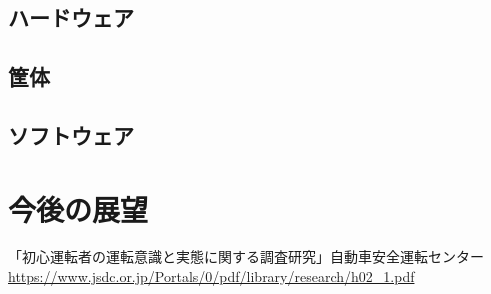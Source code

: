 \documentclass[titlepage,a4paper]{jsarticle}
\begin{document}
\subsection{ハードウェア}
\subsection{筐体}
\subsection{ソフトウェア}

\section{今後の展望}

\begin{thebibliography}{99}
   「初心運転者の運転意識と実態に関する調査研究」自動車安全運転センター\\
  \url{https://www.jsdc.or.jp/Portals/0/pdf/library/research/h02_1.pdf}

\end{thebibliography}
\end{document}
